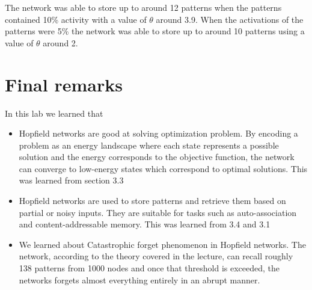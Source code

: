\documentclass[a4paper]{article}
\begin{document}
The network was able to store up to around 12 patterns when the patterns contained 10\% activity with a value of $\theta$ around 3.9. When the activations of the patterns were 5\% the network was able to store up to around 10 patterns using a value of $\theta$ around 2. 


\section{Final remarks}
In this lab we learned that 
\begin{itemize}
    \item Hopfield networks are good at solving optimization problem. By encoding a problem as an energy landscape where each state represents a possible solution and the energy corresponds to the objective function, the network can converge to low-energy states which correspond to optimal solutions. This was learned from section 3.3 
    \item Hopfield networks are used to store patterns and retrieve them based on partial or noisy inputs. They are suitable for tasks such as auto-association and content-addressable memory. This was learned from 3.4 and 3.1 
    \item We learned about Catastrophic forget phenomenon in Hopfield networks. The network, according to the theory covered in the lecture, can recall roughly 138 patterns from 1000 nodes and once that threshold is exceeded, the networks forgets almost everything entirely in an abrupt manner.
    \end{itemize}
\end{document}
